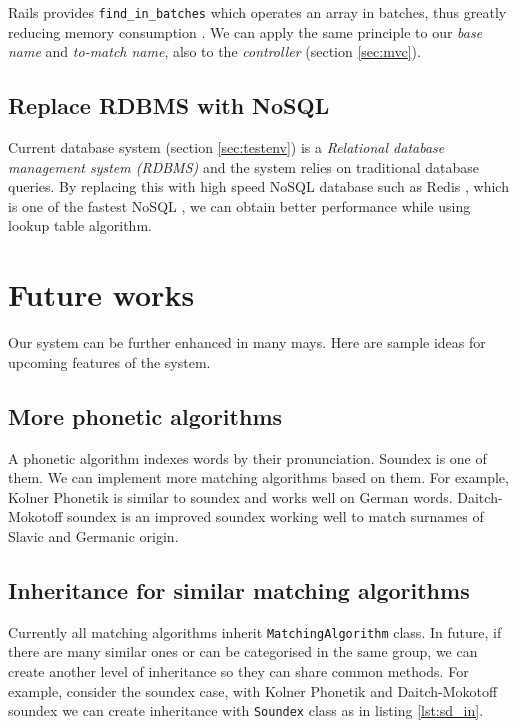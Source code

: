 Rails provides \texttt{find\_in\_batches} which operates an array in batches,
thus greatly reducing memory consumption \cite[]{fib}. We can apply
the same principle to our \emph{base name} and \emph{to-match name},
also to the \emph{controller} (section \ref{sec:mvc}).

\subsection{Replace RDBMS with NoSQL}

Current database system (section \ref{sec:testenv}) is a
\emph{Relational database management system (RDBMS)} \cite[]{rdbms} and the system
relies on traditional database queries. By replacing this with high speed
NoSQL database such as Redis \cite[]{redis}, which is one of the fastest
NoSQL \cite[]{redis2}, we can obtain better performance while using
lookup table algorithm.

\section{Future works}

Our system can be further enhanced in many mays. Here are sample ideas
for upcoming features of the system.

\subsection{More phonetic algorithms}

A phonetic algorithm \cite[]{phonea} indexes words by their pronunciation.
Soundex is one of them. We can implement more matching algorithms
based on them. For example, Kolner Phonetik \cite[]{kolner} is similar to
soundex and works well on German words. Daitch-Mokotoff soundex \cite[]{dms}
is an improved soundex working well to match surnames of Slavic and Germanic origin.

\subsection{Inheritance for similar matching algorithms}

Currently all matching algorithms inherit \texttt{MatchingAlgorithm} class.
In future, if there are many similar ones or can be categorised in the
same group, we can create another level of inheritance so they can share
common methods. For example, consider the soundex case, with Kolner Phonetik
and Daitch-Mokotoff soundex we can create inheritance with \texttt{Soundex} class
as in listing \ref{lst:sd_in}.


